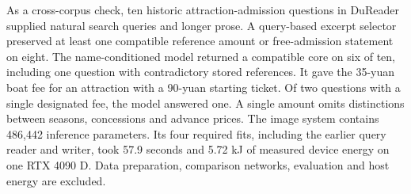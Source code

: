 As a cross-corpus check, ten historic attraction-admission questions in DuReader supplied natural search queries and longer prose. A query-based excerpt selector preserved at least one compatible reference amount or free-admission statement on eight. The name-conditioned model returned a compatible core on six of ten, including one question with contradictory stored references. It gave the 35-yuan boat fee for an attraction with a 90-yuan starting ticket. Of two questions with a single designated fee, the model answered one. A single amount omits distinctions between seasons, concessions and advance prices. The image system contains 486,442 inference parameters. Its four required fits, including the earlier query reader and writer, took 57.9 seconds and 5.72 kJ of measured device energy on one RTX 4090 D. Data preparation, comparison networks, evaluation and host energy are excluded.
